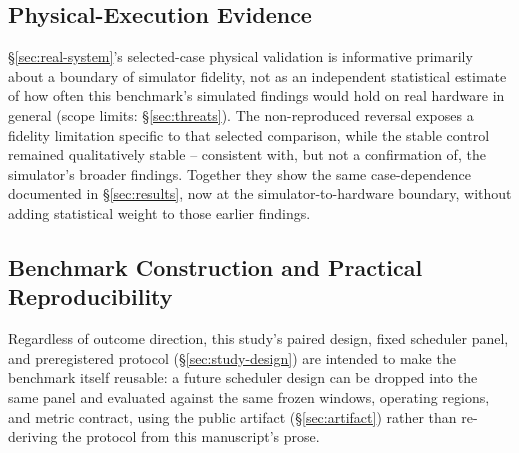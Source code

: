 \subsection{Physical-Execution Evidence}

\S\ref{sec:real-system}'s selected-case physical validation is informative
primarily about a boundary of simulator fidelity, not as an independent
statistical estimate of how often this benchmark's simulated findings
would hold on real hardware in general (scope limits:
\S\ref{sec:threats}). The non-reproduced reversal exposes a fidelity
limitation specific to that selected comparison, while the stable control
remained qualitatively stable -- consistent with, but not a confirmation
of, the simulator's broader findings. Together they show the same
case-dependence documented in \S\ref{sec:results}, now at the
simulator-to-hardware boundary, without adding statistical weight to those
earlier findings.

\subsection{Benchmark Construction and Practical Reproducibility}

Regardless of outcome direction, this study's paired design, fixed
scheduler panel, and preregistered protocol (\S\ref{sec:study-design})
are intended to make the benchmark itself reusable: a future scheduler
design can be dropped into the same panel and evaluated against the same
frozen windows, operating regions, and metric contract, using the public
artifact (\S\ref{sec:artifact}) rather than re-deriving the protocol
from this manuscript's prose.
